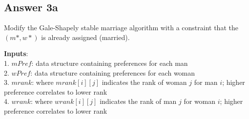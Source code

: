 \documentclass[twoside]{article}
\begin{document}
\subsection{Answer 3a}

Modify the Gale-Shapely stable marriage algorithm with a constraint that the $(m*,w*)$ is already assigned (married).

\textbf{Inputs}:\\
1. $mPref$: data structure containing preferences for each man \\
2. $wPref$: data structure containing preferences for each woman \\
3. $mrank$: where $mrank[i][j]$ indicates the rank of woman $j$ for man $i$; higher preference correlates to lower rank \\
4. $wrank$: where $wrank[i][j]$ indicates the rank of man $j$ for woman $i$; higher preference correlates to lower rank \\
\end{document}

